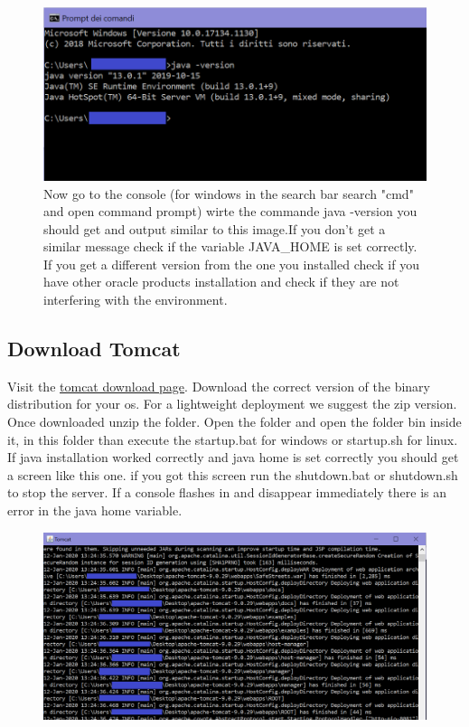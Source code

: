 \begin{figure}[h]
\centering
\includegraphics[width=\textwidth]{Images/javaInstallationCheck.png}
\caption{\label{fig:myi} Now go to the console (for windows in the search bar search "cmd" and open command prompt) wirte the commande java -version
you should get and output similar to this image.If you don't get a similar message check if the variable JAVA\_HOME is set correctly. If you get a different version from the one you installed check if you have other oracle products installation and check if they are not interfering with the environment.}
\end{figure} 



\clearpage
\subsection{Download Tomcat}
Visit the \href{https://tomcat.apache.org/download-90.cgi}{tomcat download page}.
Download the correct version of the binary distribution for your os. For a lightweight deployment we suggest the zip version.
Once downloaded unzip the folder. Open the folder and open the folder bin inside it, in this folder than execute the startup.bat for windows or startup.sh for linux. If java installation worked correctly and java home is set correctly you should get a screen like this one.
if you got this screen run the shutdown.bat or shutdown.sh to stop the server. If a console flashes in and disappear immediately there is an error in the java home variable.
\begin{figure}[h]
\centering
\includegraphics[width=\textwidth]{Images/tomcatStartup.png}
\end{figure} 
\clearpage
